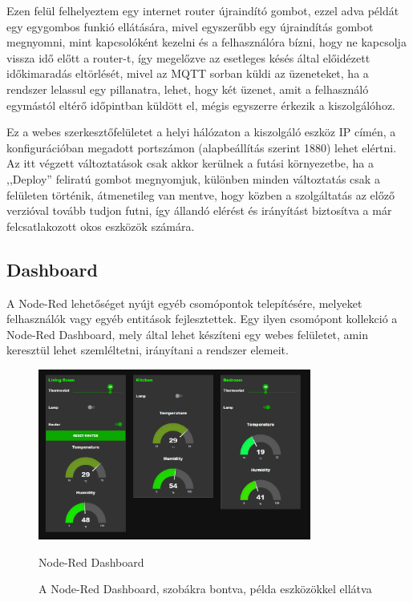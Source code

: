 \documentclass[
]{thesis-ekf}
\theoremstyle{definition}
\theoremstyle{remark}
\begin{document}
Ezen felül felhelyeztem egy internet router újraindító gombot, ezzel adva példát egy egygombos funkió ellátására, mivel egyszerűbb egy újraindítás gombot megnyomni, 
mint kapcsolóként kezelni és a felhasználóra bízni, hogy ne kapcsolja vissza idő előtt a router-t, így megelőzve az esetleges 
késés által előidézett időkimaradás eltörlését, mivel az MQTT sorban küldi az üzeneteket, ha a rendszer lelassul egy pillanatra, 
lehet, hogy két üzenet, amit a felhasználó egymástól eltérő időpintban küldött el, mégis egyszerre érkezik a kiszolgálóhoz.

Ez a webes szerkesztőfelületet a helyi hálózaton a kiszolgáló eszköz IP címén, a konfigurációban megadott portszámon (alapbeállítás szerint 1880) lehet elértni.
Az itt végzett változtatások csak akkor kerülnek a futási környezetbe, ha a ,,Deploy'' feliratú gombot megnyomjuk, különben minden változtatás
csak a felületen történik, átmenetileg van mentve, hogy közben a szolgáltatás az előző verzióval tovább tudjon futni, így
állandó elérést és irányítást biztosítva a már felcsatlakozott okos eszközök számára.

\subsection{Dashboard}
A Node-Red lehetőséget nyújt egyéb csomópontok telepítésére, melyeket felhasználók vagy egyéb entitások fejlesztettek. 
Egy ilyen csomópont kollekció a Node-Red Dashboard\cite{dashboard}, mely által lehet készíteni egy webes felületet, amin keresztül lehet szemléltetni, irányítani a rendszer elemeit. 
\begin{center}
	\begin{figure}[h]
		\includegraphics[width=0.8\textwidth]{images/dashboard.jpg}
		\caption{Node-Red Dashboard\cite{dashboard}}
		\caption{A Node-Red Dashboard, szobákra bontva, példa eszközökkel ellátva}
	\end{figure}
\end{center}
\end{document}
